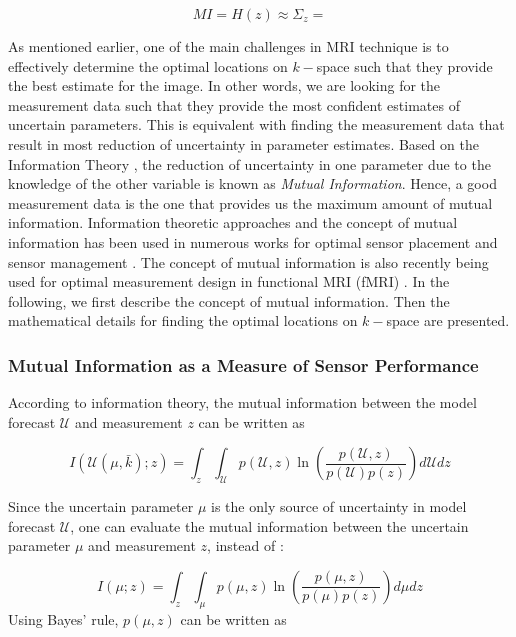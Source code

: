 \documentclass{article}         %
\theoremstyle{definition}
\theoremstyle{remark}
\begin{document}
\[
 MI = H(z) \approx \Sigma_z = 
\]

As mentioned earlier, one of the main challenges in MRI technique is to effectively determine the optimal locations on $k-$space such that they provide the best estimate for the image. In other words, we are looking for the measurement data such that they provide the most confident estimates of uncertain parameters. This is equivalent with finding the measurement data that result in most reduction of uncertainty in parameter estimates. Based on the Information Theory \cite{cover2012elements}, the reduction of uncertainty in one parameter due to the knowledge of the other variable is known as \textit{Mutual Information}. Hence, a good measurement data is the one that provides us the maximum amount of mutual information. Information theoretic approaches and the concept of mutual information has been used in numerous works for optimal sensor placement and sensor management \cite{bourgault2002information,martinez2006optimal,tharmarasa2007large,williams2007approximate,krause2008,choi2010continuous,julian2012distributed,madankan_jae,Madankan_dydess}. The concept of mutual information is also recently being used for optimal measurement design in functional MRI (fMRI) \cite{yan2014linear}. In the following, we first describe the concept of mutual information. Then the mathematical details for finding the optimal locations on $k-$space are presented.

\subsubsection*{Mutual Information as a Measure of Sensor Performance}
According to information theory, the mutual information \cite{cover2012elements} between the model forecast $\mathcal{U}$ and measurement $z$ can be written as

\begin{equation}\label{mutual_info_u}
I(\mathcal{U}(\mu,\bar{k});z) = \int_{z}\int_{\mathcal{U}} p(\mathcal{U},z)\ln\left(\frac{p(\mathcal{U},z)}{p(\mathcal{U})p(z)}\right)d\mathcal{U} dz
\end{equation}

Since the uncertain parameter $\mu$ is the only source of uncertainty in model forecast $\mathcal{U}$, one can evaluate the mutual information between the uncertain parameter $\mu$ and measurement $z$, instead of :

\begin{equation}\label{mutual_info}
I(\mu;z) = \int_{z}\int_{\mu} p(\mu,z)\ln\left(\frac{p(\mu,z)}{p(\mu)p(z)}\right)d\mu dz
\end{equation}
Using Bayes' rule, $p(\mu,z)$ can be written as
\end{document}
